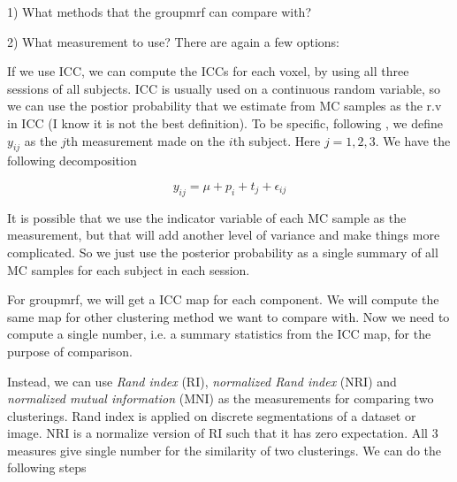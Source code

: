 \documentclass[final,authoryear,5p,twocolumn]{elsarticle}
\begin{document}
1) What methods that the \textsf{groupmrf} can compare with?

2) What measurement to use? There are again a few options:

If we use ICC, we can compute the ICCs for each voxel, by using all three
sessions of all subjects. ICC is usually used on a continuous random variable,
so we can use the postior probability that we estimate from MC samples as the
r.v in ICC (I know it is not the best definition).  To be specific, following
\cite{zuo2010reliable}, we define $y_{ij}$ as the $j$th measurement made on the
$i$th subject. Here $j = 1, 2, 3$. We have the following decomposition

\[
y_{ij} = \mu + p_i + t_j + \epsilon_{ij}
\]


It is possible that we use the indicator variable of each MC sample as the
measurement, but that will add another level of variance and make things more
complicated. So we just use the posterior probability as a single summary of all
MC samples for each subject in each session.

For \textsf{groupmrf}, we will get a ICC map for each component. We will compute
the same map for other clustering method we want to compare with. Now we need to
compute a single number, i.e. a summary statistics from the ICC map, for the
purpose of comparison.

Instead, we can use \emph{Rand index} (RI), \emph{normalized Rand index} (NRI)
and \emph{normalized mutual information} (MNI) as the measurements for comparing
two clusterings. Rand index is applied on discrete segmentations of a dataset or
image. NRI is a normalize version of RI such that it has zero expectation. All 3
measures give single number for the similarity of two clusterings. We can do the
following steps
\end{document}
